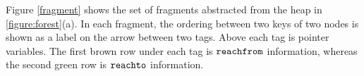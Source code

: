 Figure \ref{fragment} shows the set of fragments abstracted from the heap in \ref{figure:forest}(a). In each fragment, the ordering between two keys of two nodes is shown as a label on the arrow between two tags. Above each tag is pointer variables. The first brown row under each tag is $\tt reachfrom$ information, whereas the second green row is $\tt reachto$ information.





